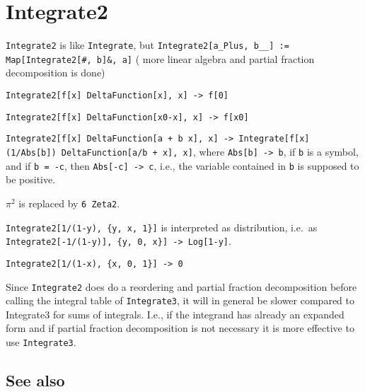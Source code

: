 \documentclass[../FeynCalcManual.tex]{subfiles}
\begin{document}
\hypertarget{integrate2}{%
\section{Integrate2}\label{integrate2}}

\texttt{Integrate2} is like \texttt{Integrate}, but
\texttt{Integrate2[\allowbreak{}a_Plus,\ \allowbreak{}b__] := Map[\allowbreak{}Integrate2[\allowbreak{}\#{}\allowbreak{},\ \allowbreak{}b]\&{}\allowbreak{},\ \allowbreak{}a]}
( more linear algebra and partial fraction decomposition is done)

\texttt{Integrate2[\allowbreak{}f[\allowbreak{}x] DeltaFunction[\allowbreak{}x],\ \allowbreak{}x] -> f[\allowbreak{}0]}

\texttt{Integrate2[\allowbreak{}f[\allowbreak{}x] DeltaFunction[\allowbreak{}x0-x],\ \allowbreak{}x] -> f[\allowbreak{}x0]}

\texttt{Integrate2[\allowbreak{}f[\allowbreak{}x] DeltaFunction[\allowbreak{}a + b x],\ \allowbreak{}x] -> Integrate[\allowbreak{}f[\allowbreak{}x] (1/Abs[\allowbreak{}b]) DeltaFunction[\allowbreak{}a/b + x],\ \allowbreak{}x]},
where \texttt{Abs[\allowbreak{}b] -> b}, if \texttt{b} is a symbol, and
if \texttt{b = -c}, then \texttt{Abs[\allowbreak{}-c] -> c}, i.e., the
variable contained in \texttt{b} is supposed to be positive.

\(\pi ^2\) is replaced by \texttt{6 Zeta2}.

\texttt{Integrate2[\allowbreak{}1/(1-y),\ \allowbreak{}\{\allowbreak{}y,\ \allowbreak{}x,\ \allowbreak{}1\}]}
is interpreted as distribution, i.e.~as
\texttt{Integrate2[\allowbreak{}-1/(1-y)],\ \allowbreak{}\{\allowbreak{}y,\ \allowbreak{}0,\ \allowbreak{}x\}] -> Log[\allowbreak{}1-y]}.

\texttt{Integrate2[\allowbreak{}1/(1-x),\ \allowbreak{}\{\allowbreak{}x,\ \allowbreak{}0,\ \allowbreak{}1\}] -> 0}

Since \texttt{Integrate2} does do a reordering and partial fraction
decomposition before calling the integral table of \texttt{Integrate3},
it will in general be slower compared to Integrate3 for sums of
integrals. I.e., if the integrand has already an expanded form and if
partial fraction decomposition is not necessary it is more effective to
use \texttt{Integrate3}.

\subsection{See also}
\end{document}
